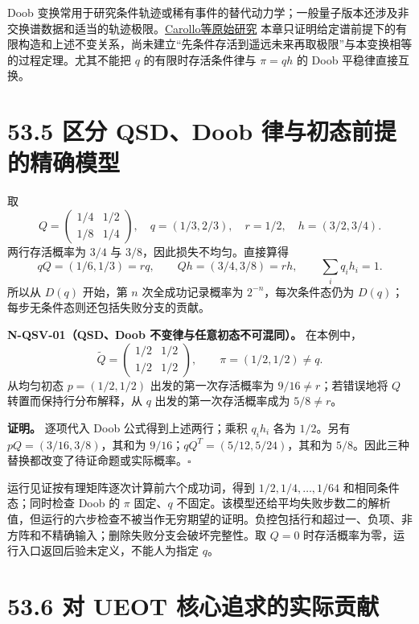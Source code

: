 \documentclass[
  11pt,
  oneside]{book}
\begin{document}
Doob
变换常用于研究条件轨迹或稀有事件的替代动力学；一般量子版本还涉及非交换谱数据和适当的轨迹极限。\href{https://arxiv.org/abs/1711.10951}{Carollo等原始研究}
本章只证明给定谱前提下的有限构造和上述不变关系，尚未建立``先条件存活到遥远未来再取极限''与本变换相等的过程定理。尤其不能把
\(q\) 的有限时存活条件律与 \(\pi=qh\) 的 Doob 平稳律直接互换。

\hypertarget{ux533aux5206-qsddoob-ux5f8bux4e0eux521dux6001ux524dux63d0ux7684ux7cbeux786eux6a21ux578b}{%
\section{53.5 区分 QSD、Doob
律与初态前提的精确模型}\label{ux533aux5206-qsddoob-ux5f8bux4e0eux521dux6001ux524dux63d0ux7684ux7cbeux786eux6a21ux578b}}

取 \[
Q=\begin{pmatrix}1/4&1/2\\1/8&1/4\end{pmatrix},\quad
q=(1/3,2/3),\quad r=1/2,\quad h=(3/2,3/4).
\] 两行存活概率为 \(3/4\) 与 \(3/8\)，因此损失不均匀。直接算得 \[
qQ=(1/6,1/3)=rq,\qquad
Qh=(3/4,3/8)=rh,\qquad \sum_iq_ih_i=1.
\] 所以从 \(D(q)\) 开始，第 \(n\) 次全成功记录概率为
\(2^{-n}\)，每次条件态仍为
\(D(q)\)；每步无条件态则还包括失败分支的贡献。

\protect\hypertarget{n-qsv-01}{}{}

\textbf{N-QSV-01（QSD、Doob 不变律与任意初态不可混同）。} 在本例中， \[
\widetilde Q=\begin{pmatrix}1/2&1/2\\1/2&1/2\end{pmatrix},\qquad
\pi=(1/2,1/2)\ne q.
\] 从均匀初态 \(p=(1/2,1/2)\) 出发的第一次存活概率为
\(9/16\ne r\)；若错误地将 \(Q\) 转置而保持行分布解释，从 \(q\)
出发的第一次存活概率成为 \(5/8\ne r\)。

\textbf{证明。} 逐项代入 Doob 公式得到上述两行；乘积 \(q_ih_i\) 各为
\(1/2\)。另有 \(pQ=(3/16,3/8)\)，其和为
\(9/16\)；\(qQ^T=(5/12,5/24)\)，其和为
\(5/8\)。因此三种替换都改变了待证命题或实际概率。\(\square\)

运行见证按有理矩阵逐次计算前六个成功词，得到 \(1/2,1/4,\ldots,1/64\)
和相同条件态；同时检查 Doob 的 \(\pi\) 固定、\(q\)
不固定。该模型还给平均失败步数二的解析值，但运行的六步检查不被当作无穷期望的证明。负控包括行和超过一、负项、非方阵和不精确输入；删除失败分支会破坏完整性。取
\(Q=0\) 时存活概率为零，运行入口返回后验未定义，不能人为指定 \(q\)。

\hypertarget{ux5bf9-ueot-ux6838ux5fc3ux8ffdux6c42ux7684ux5b9eux9645ux8d21ux732e}{%
\section{53.6 对 UEOT
核心追求的实际贡献}\label{ux5bf9-ueot-ux6838ux5fc3ux8ffdux6c42ux7684ux5b9eux9645ux8d21ux732e}}
\end{document}
